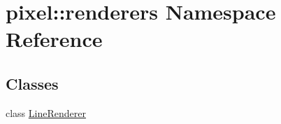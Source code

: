\hypertarget{namespacepixel_1_1renderers}{}\section{pixel\+:\+:renderers Namespace Reference}
\label{namespacepixel_1_1renderers}
\subsection*{Classes}
\begin{DoxyCompactItemize}
\item 
class \hyperlink{classpixel_1_1renderers_1_1_line_renderer}{Line\+Renderer}
\end{DoxyCompactItemize}
